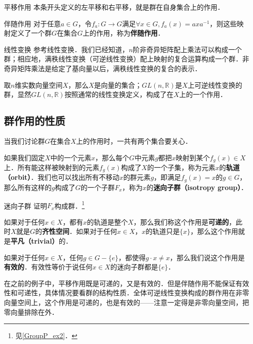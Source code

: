 \begin{example}{平移作用}\label{Group3_ex1}
本条开头定义的左平移和右平移，就是群在自身集合上的作用．
\end{example}

\begin{example}{伴随作用}\label{Group3_ex2}
对于任意$a\in G$，令$f_a: G\rightarrow G$满足$\forall x\in G, f_a(x)=axa^{-1}$，则这些映射定义了一个群$G$在集合$G$上的作用，称为\textbf{伴随作用}．
\end{example}

\begin{example}{线性变换}\label{Group3_ex3}
参考线性变换．我们已经知道，$n$阶非奇异矩阵配上乘法可以构成一个群；相应地，满秩线性变换（可逆线性变换）配上映射的复合运算构成一个群．非奇异矩阵乘法是给定了基向量以后，满秩线性变换的复合的表示．

取$n$维实数向量空间$X$，那么$X$是向量的集合；$GL(n,\mathbb{R})$是$X$上可逆线性变换的群，显然$GL(n,\mathbb{R})$按照通常的线性变换定义，构成了在$X$上的一个作用．
\end{example}

\subsection{群作用的性质}

当我们讨论群$G$在集合$X$上的作用时，一共有两个集合要关心．

如果我们固定$X$中的一个元素$x$，那么每个$G$中元素$g$都把$x$映射到某个$f_g(x)\in X$上．所有能这样被映射到的元素$f_g(x)$构成了$X$的一个子集，称为元素$x$的\textbf{轨道（orbit）}．我们也可以找出所有不移动$x$的群元素$g$，即满足$f_g(x)=x$的$g\in G$，那么所有这样的$g$构成了$G$的一个子群$F_x$，称为$x$的\textbf{迷向子群（isotropy group）}．

\begin{exercise}{迷向子群}\label{Group3_exe1}
证明$F_x$构成群．\footnote{见\autoref{GroupP_ex2}．}
\end{exercise}

如果对于任何$x\in X$，都有$x$的轨道是整个$X$，那么我们称这个作用是\textbf{可递的}，此时$X$就是$G$的\textbf{齐性空间}．如果对于任何$x\in X$，$x$的轨道只是$\{x\}$，那么这个作用就是\textbf{平凡（trivial）}的．

如果对于任何$x\in X$，任何$g\in G-\{e\}$，都使得$g\cdot x\not=x$，那么我们说这个作用是\textbf{有效的}．有效性等价于说任何$x\in X$的迷向子群都是$\{e\}$．

在之前的例子中，平移作用既是可递的，又是有效的．但是伴随作用不能保证有效性和可递性，具体情况要看群的结构性质．全体可逆线性变换构成的群作用在非零向量空间上，这个作用是可递的，也是有效的——注意一定得是非零向量空间，把零向量排除在外．

